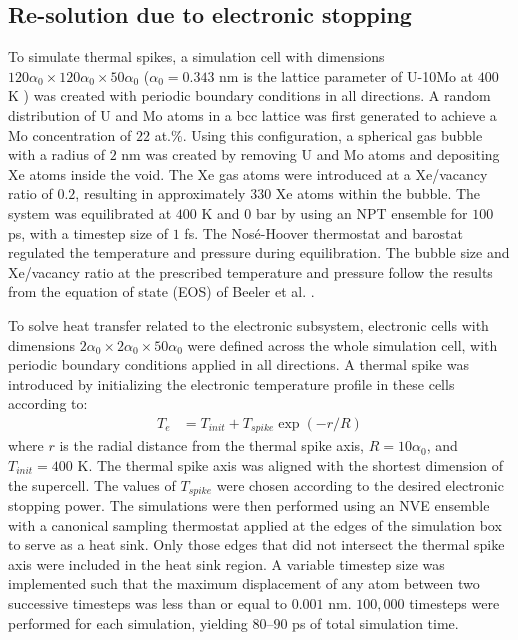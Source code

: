 \documentclass[review]{elsarticle}
\begin{document}
\subsection{Re-solution due to electronic stopping}
\label{sec:elec}

To simulate thermal spikes, a simulation cell with dimensions
$120 \alpha_0 \times 120 \alpha_0 \times 50 \alpha_0$
($\alpha_0 = 0.343$ nm is the lattice parameter of U-10Mo at $400$ K
\cite{phillips2010})
was created with periodic boundary conditions in all directions.
A random distribution of U and Mo atoms in a bcc lattice
was first generated to achieve a Mo concentration of $22$ at.\%.
Using this configuration,
a spherical gas bubble with a radius of $2$ nm was created
by removing U and Mo atoms and depositing Xe atoms inside the void.
The Xe gas atoms were introduced at a Xe/vacancy ratio of $0.2$,
resulting in approximately $330$ Xe atoms within the bubble.
The system was equilibrated at $400$ K and $0$ bar
by using an NPT ensemble for $100$ ps, with a timestep size of $1$ fs.
The Nos\'e-Hoover thermostat and barostat
regulated the temperature and pressure during equilibration.
The bubble size and Xe/vacancy ratio at the prescribed temperature and pressure
follow the results from the equation of state (EOS) of Beeler et al.
\cite{beeler2020improved}.

To solve heat transfer related to the electronic subsystem,
electronic cells with dimensions
$2 \alpha_0 \times 2 \alpha_0 \times 50 \alpha_0$
were defined across the whole simulation cell,
with periodic boundary conditions applied in all directions.
A thermal spike was introduced
by initializing the electronic temperature profile in these cells according to:
\begin{align}
	T_e &= T_{init} + T_{spike} \exp\left( -r / R \right)
\end{align}
where $r$ is the radial distance from the thermal spike axis,
$R = 10 \alpha_0$, and $T_{init} = 400$ K.
The thermal spike axis was aligned with the shortest dimension of the supercell.
The values of $T_{spike}$ were chosen
according to the desired electronic stopping power.
The simulations were then performed using an NVE ensemble
with a canonical sampling thermostat \cite{bussi2007}
applied at the edges of the simulation box to serve as a heat sink.
Only those edges that did not intersect the thermal spike axis
were included in the heat sink region.
A variable timestep size was implemented
such that the maximum displacement of any atom
between two successive timesteps was less than or equal to $0.001$ nm.
$100,000$ timesteps were performed for each simulation,
yielding $80$--$90$ ps of total simulation time.
\end{document}
